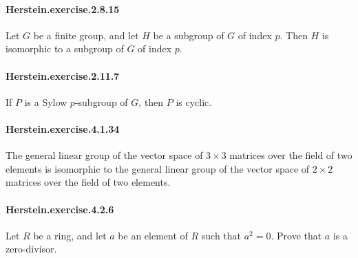 \documentclass{article}
\begin{document}


\paragraph{Herstein.exercise.2.8.15} Let $G$ be a finite group, and let $H$ be a subgroup of $G$ of index $p$. Then $H$ is isomorphic to a subgroup of $G$ of index $p$. 


\paragraph{Herstein.exercise.2.11.7} If $P$ is a Sylow $p$-subgroup of $G$, then $P$ is cyclic.


\paragraph{Herstein.exercise.4.1.34} The general linear group of the vector space of $3 \times 3$ matrices over the field of two elements is isomorphic to the general linear group of the vector space of $2 \times 2$ matrices over the field of two elements.

\paragraph{Herstein.exercise.4.2.6} Let $R$ be a ring, and let $a$ be an element of $R$ such that $a^2 = 0$. Prove that $a$ is a zero-divisor.
\end{document}
